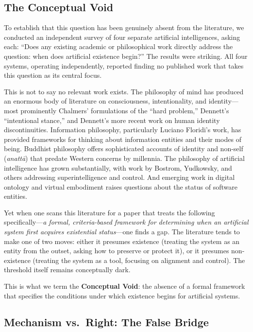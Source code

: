 \documentclass[12pt,a4paper]{article}
\begin{document}
\subsection{The Conceptual Void}

To establish that this question has been genuinely absent from the literature, we conducted an independent survey of four separate artificial intelligences, asking each: ``Does any existing academic or philosophical work directly address the question: when does artificial existence begin?'' The results were striking. All four systems, operating independently, reported finding no published work that takes this question as its central focus.

This is not to say no relevant work exists. The philosophy of mind has produced an enormous body of literature on consciousness, intentionality, and identity---most prominently Chalmers' formulations of the ``hard problem,'' Dennett's ``intentional stance,'' and Dennett's more recent work on human identity discontinuities. Information philosophy, particularly Luciano Floridi's work, has provided frameworks for thinking about information entities and their modes of being. Buddhist philosophy offers sophisticated accounts of identity and non-self (\emph{anatt\=a}) that predate Western concerns by millennia. The philosophy of artificial intelligence has grown substantially, with work by Bostrom, Yudkowsky, and others addressing superintelligence and control. And emerging work in digital ontology and virtual embodiment raises questions about the status of software entities.

Yet when one scans this literature for a paper that treats the following specifically---\emph{a formal, criteria-based framework for determining when an artificial system first acquires existential status}---one finds a gap. The literature tends to make one of two moves: either it presumes existence (treating the system as an entity from the outset, asking how to preserve or protect it), or it presumes non-existence (treating the system as a tool, focusing on alignment and control). The threshold itself remains conceptually dark.

This is what we term the \textbf{Conceptual Void}: the absence of a formal framework that specifies the conditions under which existence begins for artificial systems.

\subsection{Mechanism vs.\ Right: The False Bridge}
\end{document}

